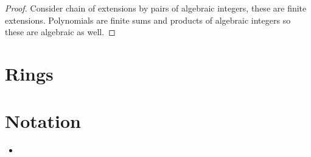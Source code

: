 \documentclass{tufte-book}
\begin{document}
\begin{proof}
    Consider chain of extensions by pairs of algebraic integers, these are finite extensions. Polynomials are finite sums and products of algebraic integers so these are algebraic as well.
\end{proof}

\chapter{Rings}
\label{ch:ring}

\chapter{Notation}

\begin{itemize}
  \item 
\end{itemize}

\backmatter




\printindex
\end{document}
